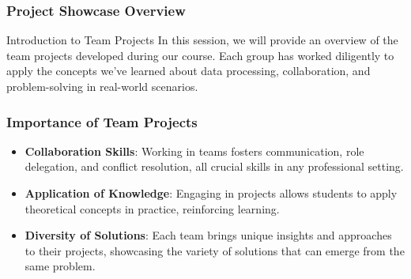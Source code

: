 \documentclass[aspectratio=169]{beamer}
\begin{document}
\begin{frame}[fragile]
    \frametitle{Project Showcase Overview}

    \begin{block}{Introduction to Team Projects}
        In this session, we will provide an overview of the team projects developed during our course. Each group has worked diligently to apply the concepts we've learned about data processing, collaboration, and problem-solving in real-world scenarios. 
    \end{block}
\end{frame}

\begin{frame}[fragile]
    \frametitle{Importance of Team Projects}

    \begin{itemize}
        \item \textbf{Collaboration Skills}: 
            Working in teams fosters communication, role delegation, and conflict resolution, all crucial skills in any professional setting.
        \item \textbf{Application of Knowledge}: 
            Engaging in projects allows students to apply theoretical concepts in practice, reinforcing learning.
        \item \textbf{Diversity of Solutions}: 
            Each team brings unique insights and approaches to their projects, showcasing the variety of solutions that can emerge from the same problem.
    \end{itemize}
\end{frame}
\end{document}

